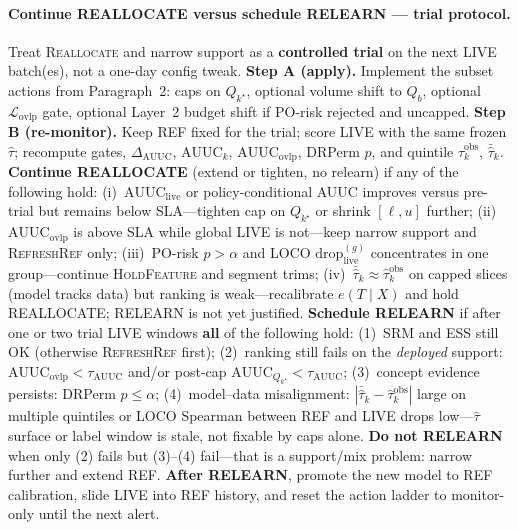 \paragraph{Continue REALLOCATE versus schedule RELEARN --- trial protocol.}
Treat \textsc{Reallocate} and narrow support as a \textbf{controlled trial} on the next LIVE batch(es), not a one-day config tweak.
\textbf{Step A (apply).} Implement the subset actions from Paragraph~2: caps on $Q_{k^\star}$, optional volume shift to $Q_b$, optional $\mathcal{L}_{\mathrm{ovlp}}$ gate, optional Layer~2 budget shift if PO-risk rejected and uncapped.
\textbf{Step B (re-monitor).} Keep REF fixed for the trial; score LIVE with the same frozen $\hat\tau$; recompute gates, $\Delta_{\mathrm{AUUC}}$, $\mathrm{AUUC}_k$, $\mathrm{AUUC}_{\mathrm{ovlp}}$, DRPerm $p$, and quintile $\widehat{\tau}^{\mathrm{obs}}_k$, $\bar{\hat\tau}_k$.
\textbf{Continue REALLOCATE} (extend or tighten, no relearn) if any of the following hold:
(i)~$\mathrm{AUUC}_{\mathrm{live}}$ or policy-conditional AUUC improves versus pre-trial but remains below SLA---tighten cap on $Q_{k^\star}$ or shrink $[\ell,u]$ further;
(ii)~$\mathrm{AUUC}_{\mathrm{ovlp}}$ is above SLA while global LIVE is not---keep narrow support and \textsc{RefreshRef} only;
(iii)~PO-risk $p>\alpha$ and LOCO $\mathrm{drop}_{\mathrm{live}}^{(g)}$ concentrates in one group---continue \textsc{HoldFeature} and segment trims;
(iv)~$\bar{\hat\tau}_k\approx\widehat{\tau}^{\mathrm{obs}}_k$ on capped slices (model tracks data) but ranking is weak---recalibrate $e(T\mid X)$ and hold REALLOCATE; RELEARN is not yet justified.
\textbf{Schedule RELEARN} if after one or two trial LIVE windows \textbf{all} of the following hold:
(1)~SRM and ESS still OK (otherwise \textsc{RefreshRef} first);
(2)~ranking still fails on the \emph{deployed} support: $\mathrm{AUUC}_{\mathrm{ovlp}}<\tau_{\mathrm{AUUC}}$ and/or post-cap $\mathrm{AUUC}_{Q_{k^\star}}<\tau_{\mathrm{AUUC}}$;
(3)~concept evidence persists: DRPerm $p\le\alpha$;
(4)~model--data misalignment: $|\bar{\hat\tau}_k-\widehat{\tau}^{\mathrm{obs}}_k|$ large on multiple quintiles or LOCO Spearman between REF and LIVE drops low---$\hat\tau$ surface or label window is stale, not fixable by caps alone.
\textbf{Do not RELEARN} when only (2) fails but (3)--(4) fail---that is a support/mix problem: narrow further and extend REF.
\textbf{After RELEARN}, promote the new model to REF calibration, slide LIVE into REF history, and reset the action ladder to monitor-only until the next alert.

